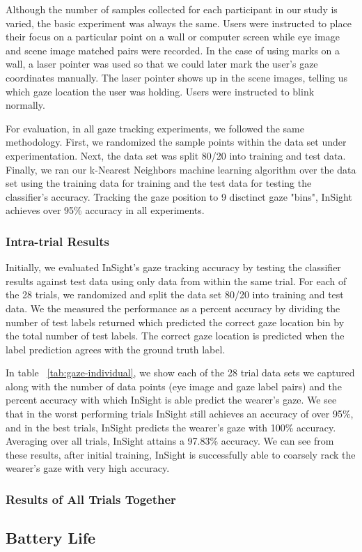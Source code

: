 Although the number of samples collected for each participant in our study is varied, the basic experiment was always the same.  Users were instructed to place their focus on a particular point on a wall or computer screen while eye image and scene image matched pairs were recorded.  In the case of using marks on a wall, a laser pointer was used so that we could later mark the user's gaze coordinates manually.  The laser pointer shows up in the scene images, telling us which gaze location the user was holding.  Users were instructed to blink normally.

For evaluation, in all gaze tracking experiments, we followed the same methodology.  First, we randomized the sample points within the data set under experimentation.  Next, the data set was split 80/20 into training and test data.  Finally, we ran our k-Nearest Neighbors machine learning algorithm over the data set using the training data for training and the test data for testing the classifier's accuracy.  Tracking the gaze position to 9 disctinct gaze "bins", InSight achieves over 95\% accuracy in all experiments.

\subsubsection{Intra-trial Results}

Initially, we evaluated InSight's gaze tracking accuracy by testing the classifier results against test data using only data from within the same trial.  For each of the 28 trials, we randomized and split the data set 80/20 into training and test data.  We the measured the performance as a percent accuracy by dividing the number of test labels returned which predicted the correct gaze location bin by the total number of test labels.  The correct gaze location is predicted when the label prediction agrees with the ground truth label.

In table ~\ref{tab:gaze-individual}, we show each of the 28 trial data sets we captured along with the number of data points (eye image and gaze label pairs) and the percent accuracy with which InSight is able predict the wearer's gaze.  We see that in the worst performing trials InSight still achieves an accuracy of over 95\%, and in the best trials, InSight predicts the wearer's gaze with 100\% accuracy.  Averaging over all trials, InSight attains a 97.83\% accuracy.  We can see from these results, after initial training, InSight is successfully able to coarsely rack the wearer's gaze with very high accuracy.

\subsubsection{Results of All Trials Together}


\subsection{Battery Life}




